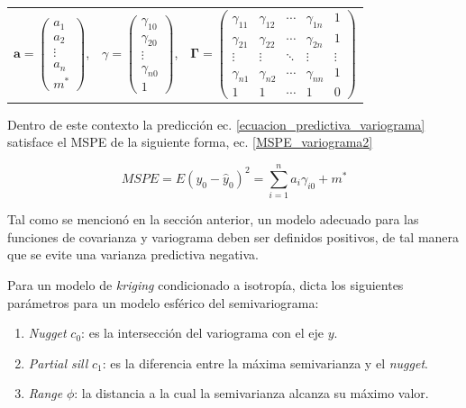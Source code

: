\documentclass[14pt]{extarticle}
\begin{document}
\begin{table}[h]
	\centering
	\begin{tabular}{ccc}
		$\mathbf{a} = \begin{pmatrix}
		a_1 \\ a_2 \\ \vdots\\ a_n \\ m^*
		\end{pmatrix}$, & $\gamma = \begin{pmatrix}
		\gamma_{10} \\ \gamma_{20} \\ \vdots \\ \gamma_{n0} \\ 1
		\end{pmatrix}$, & $\mathbf{\Gamma} = \begin{pmatrix}
		\gamma_{11} & \gamma_{12} & \cdots & \gamma_{1n} & 1 \\
		\gamma_{21} & \gamma_{22} & \cdots & \gamma_{2n} & 1 \\
		\vdots & \vdots & \ddots & \vdots & \vdots \\
		\gamma_{n1} & \gamma_{n2} & \cdots & \gamma_{nn} & 1 \\
		1 & 1 & \cdots & 1 & 0 
		\end{pmatrix}$
	\end{tabular}
\end{table}

Dentro de este contexto la predicción ec. \ref{ecuacion_predictiva_variograma} satisface el MSPE de la siguiente forma, ec. \ref{MSPE_variograma2}

\begin{equation}
	MSPE = E\left(y_0 - \hat{y}_0\right)^2 = \sum_{i=1}^{n}a_i\gamma_{i0} + m^*\label{MSPE_variograma2}
\end{equation}

Tal como se mencionó en la sección anterior, un modelo adecuado para las funciones de covarianza y variograma deben ser definidos positivos, de tal manera que se evite una varianza predictiva negativa\cite{Cressie.1986}. 

Para un modelo de \textit{kriging} condicionado a isotropía, \cite{Brus.2022} dicta los siguientes parámetros para un modelo esférico del semivariograma:

\begin{enumerate}
	\item \textit{Nugget} $c_0$: es la intersección del variograma con el eje $y$. 
	\item \textit{Partial sill} $c_1$: es la diferencia entre la máxima semivarianza y el \textit{nugget}. 
	\item \textit{Range} $\phi$: la distancia a la cual la semivarianza alcanza su máximo valor.
\end{enumerate}
\end{document}
